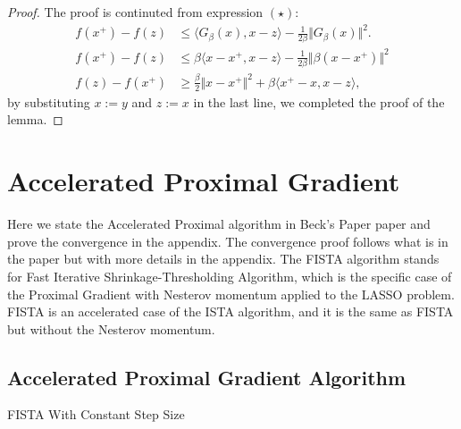 \documentclass[]{article}
\theoremstyle{definition}
\begin{document}
        \begin{proof}
            The proof is continuted from expression $(\star)$: 
            \begin{align*}
                f(x^+) - f(z) 
                &\le 
                \langle G_\beta(x), x - z\rangle - \frac{1}{2\beta}\Vert G_\beta(x)\Vert^2. 
                \\
                f(x^+) - f(z) & \le 
                \beta\langle x - x^+, x - z\rangle - \frac{1}{2\beta}\Vert \beta (x - x^+)\Vert^2
                \\
                f(z) - f(x^+) & \ge
                \frac{\beta}{2}\Vert x - x^+\Vert^2
                 + 
                \beta\langle x^+ - x, x - z\rangle, 
            \end{align*}
            by substituting $x:=y$ and $z:= x$ in the last line, we completed the proof of the lemma. 
        \end{proof}

\section{Accelerated Proximal Gradient}\label{sec:apg_intro}
    Here we state the Accelerated Proximal algorithm in Beck's Paper paper\cite{paper:FISTA} and prove the convergence in the appendix. The convergence proof follows what is in the paper but with more details in the appendix. The FISTA algorithm stands for Fast Iterative Shrinkage-Thresholding Algorithm, which is the specific case of the Proximal Gradient with Nesterov momentum applied to the LASSO problem. FISTA is an accelerated case of the ISTA algorithm, and it is the same as FISTA but without the Nesterov momentum. 
    
    \subsection{Accelerated Proximal Gradient Algorithm} 
        \begin{algorithm}[H]\label{alg:fista_1} 
        \begin{algorithmic}[1]
                \ENDIF
            \ENDFOR
        \end{algorithmic}\caption{FISTA With Constant Step Size}
        \end{algorithm}
\end{document}

